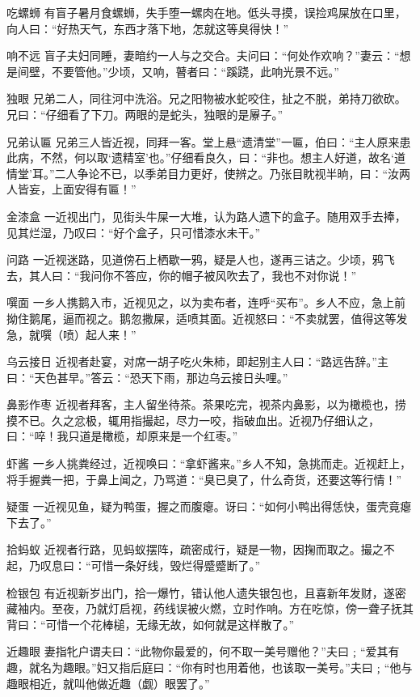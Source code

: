\documentclass[12pt,UTF8]{ctexbook}
\begin{document}
吃螺蛳
有盲子暑月食螺蛳，失手堕一螺肉在地。低头寻摸，误捡鸡屎放在口里，向人曰：“好热天气，东西才落下地，怎就这等臭得快！”

响不远
盲子夫妇同睡，妻暗约一人与之交合。夫问曰：“何处作欢响？”妻云：“想是间壁，不要管他。”少顷，又响，瞽者曰：“蹊跷，此响光景不远。”

独眼
兄弟二人，同往河中洗浴。兄之阳物被水蛇咬住，扯之不脱，弟持刀欲砍。兄曰：“仔细看了下刀。两眼的是蛇头，独眼的是屪子。”

兄弟认匾
兄弟三人皆近视，同拜一客。堂上悬“遗清堂”一匾，伯曰：“主人原来患此病，不然，何以取‘遗精室’也。”仔细看良久，曰：“非也。想主人好道，故名‘道情堂’耳。”二人争论不已，以季弟目力更好，使辨之。乃张目眈视半晌，曰：“汝两人皆妄，上面安得有匾！”

金漆盒
一近视出门，见街头牛屎一大堆，认为路人遗下的盒子。随用双手去捧，见其烂湿，乃叹曰：“好个盒子，只可惜漆水未干。”

问路
一近视迷路，见道傍石上栖歇一鸦，疑是人也，遂再三诘之。少顷，鸦飞去，其人曰：“我问你不答应，你的帽子被风吹去了，我也不对你说！”

噀面
一乡人携鹅入市，近视见之，以为卖布者，连呼“买布”。乡人不应，急上前拗住鹅尾，逼而视之。鹅忽撒屎，适喷其面。近视怒曰：“不卖就罢，值得这等发急，就噀（喷）起人来！”

乌云接日
近视者赴宴，对席一胡子吃火朱柿，即起别主人曰：“路远告辞。”主曰：“天色甚早。”答云：“恐天下雨，那边乌云接日头哩。”

鼻影作枣
近视者拜客，主人留坐待茶。茶果吃完，视茶内鼻影，以为橄榄也，捞摸不已。久之忿极，辄用指撮起，尽力一咬，指破血出。近视乃仔细认之，曰：“啐！我只道是橄榄，却原来是一个红枣。”

虾酱
一乡人挑粪经过，近视唤曰：“拿虾酱来。”乡人不知，急挑而走。近视赶上，将手握粪一把，于鼻上闻之，乃骂道：“臭已臭了，什么奇货，还要这等行情！”

疑蛋
一近视见鱼，疑为鸭蛋，握之而腹瘪。讶曰：“如何小鸭出得恁快，蛋壳竟瘪下去了。”

拾蚂蚁
近视者行路，见蚂蚁摆阵，疏密成行，疑是一物，因掬而取之。撮之不起，乃叹息曰：“可惜一条好线，毁烂得蹙蹙断了。”

检银包
有近视新岁出门，拾一爆竹，错认他人遗失银包也，且喜新年发财，遂密藏袖内。至夜，乃就灯启视，药线误被火燃，立时作响。方在吃惊，傍一聋子抚其背曰：“可惜一个花棒槌，无缘无故，如何就是这样散了。”

近趣眼
妻指牝户谓夫曰：“此物你最爱的，何不取一美号赠他？”夫曰﹔“爱其有趣，就名为趣眼。”妇又指后庭曰：“你有时也用着他，也该取一美号。”夫曰﹔“他与趣眼相近，就叫他做近趣（觑）眼罢了。”
\end{document}
